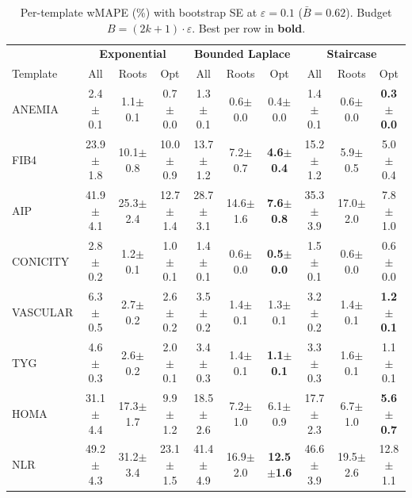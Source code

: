 \providecommand{\pmstd}[1]{{\scriptsize $\pm$#1}}

\begin{table}[t]
\centering
\setlength{\tabcolsep}{2.8pt}
\small
\caption{Per-template wMAPE (\%) with bootstrap SE at $\varepsilon = 0.1$ ($\bar{B} = 0.62$). Budget $B = (2k+1) \cdot \varepsilon$. Best per row in \textbf{bold}.}
\label{tab:rq1_2kplus1_per_tmpl_wmape}
\begin{tabular}{l|ccc|ccc|ccc}
\toprule
& \multicolumn{3}{c|}{\textbf{Exponential}} & \multicolumn{3}{c|}{\textbf{Bounded Laplace}} & \multicolumn{3}{c}{\textbf{Staircase}} \\
Template & All & Roots & Opt & All & Roots & Opt & All & Roots & Opt \\
\midrule
ANEMIA & 2.4\pmstd{0.1} & 1.1\pmstd{0.1} & 0.7\pmstd{0.0} & 1.3\pmstd{0.1} & 0.6\pmstd{0.0} & 0.4\pmstd{0.0} & 1.4\pmstd{0.1} & 0.6\pmstd{0.0} & \textbf{0.3\pmstd{0.0}} \\
FIB4 & 23.9\pmstd{1.8} & 10.1\pmstd{0.8} & 10.0\pmstd{0.9} & 13.7\pmstd{1.2} & 7.2\pmstd{0.7} & \textbf{4.6\pmstd{0.4}} & 15.2\pmstd{1.2} & 5.9\pmstd{0.5} & 5.0\pmstd{0.4} \\
AIP & 41.9\pmstd{4.1} & 25.3\pmstd{2.4} & 12.7\pmstd{1.4} & 28.7\pmstd{3.1} & 14.6\pmstd{1.6} & \textbf{7.6\pmstd{0.8}} & 35.3\pmstd{3.9} & 17.0\pmstd{2.0} & 7.8\pmstd{1.0} \\
CONICITY & 2.8\pmstd{0.2} & 1.2\pmstd{0.1} & 1.0\pmstd{0.1} & 1.4\pmstd{0.1} & 0.6\pmstd{0.0} & \textbf{0.5\pmstd{0.0}} & 1.5\pmstd{0.1} & 0.6\pmstd{0.0} & 0.6\pmstd{0.0} \\
VASCULAR & 6.3\pmstd{0.5} & 2.7\pmstd{0.2} & 2.6\pmstd{0.2} & 3.5\pmstd{0.2} & 1.4\pmstd{0.1} & 1.3\pmstd{0.1} & 3.2\pmstd{0.2} & 1.4\pmstd{0.1} & \textbf{1.2\pmstd{0.1}} \\
TYG & 4.6\pmstd{0.3} & 2.6\pmstd{0.2} & 2.0\pmstd{0.1} & 3.4\pmstd{0.3} & 1.4\pmstd{0.1} & \textbf{1.1\pmstd{0.1}} & 3.3\pmstd{0.3} & 1.6\pmstd{0.1} & 1.1\pmstd{0.1} \\
HOMA & 31.1\pmstd{4.4} & 17.3\pmstd{1.7} & 9.9\pmstd{1.2} & 18.5\pmstd{2.6} & 7.2\pmstd{1.0} & 6.1\pmstd{0.9} & 17.7\pmstd{2.3} & 6.7\pmstd{1.0} & \textbf{5.6\pmstd{0.7}} \\
NLR & 49.2\pmstd{4.3} & 31.2\pmstd{3.4} & 23.1\pmstd{1.5} & 41.4\pmstd{4.9} & 16.9\pmstd{2.0} & \textbf{12.5\pmstd{1.6}} & 46.6\pmstd{3.9} & 19.5\pmstd{2.6} & 12.8\pmstd{1.1} \\
\bottomrule
\end{tabular}
\end{table}

